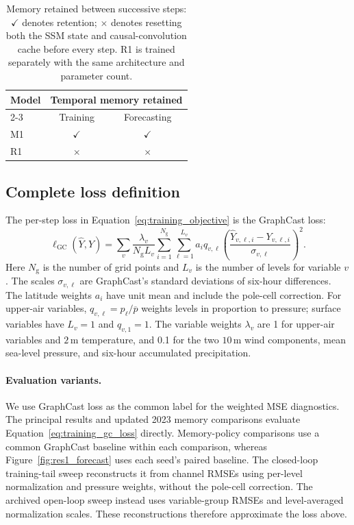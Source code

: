 \documentclass{article}
\newcommand{\vfourchange}[1]{{\color{blue}#1}}
\begin{document}
\begin{table}[!htb]
    \centering
    \small
    \begin{tabular}{lcc}
        \toprule
        \vfourchange{Model} & \multicolumn{2}{c}{Temporal memory retained} \\
        \cmidrule(lr){2-3}
        & Training & Forecasting \\
        \midrule
        \vfourchange{M1} & $\checkmark$ & $\checkmark$ \\
        \vfourchange{R1} & $\times$ & $\times$ \\
        \bottomrule
    \end{tabular}
    \caption{Memory retained between successive steps: $\checkmark$ denotes retention; $\times$ denotes resetting both the SSM state and causal-convolution cache before every step. \vfourchange{R1} is trained separately with the same architecture and parameter count.}
    \label{tab:memory_controls}
\end{table}

\subsection{Complete loss definition}
\label{app:training_loss}
The per-step loss in Equation~\ref{eq:training_objective} is the {GraphCast loss}:
\begin{equation}
    \ell_{\mathrm{GC}}(\hat{Y},Y)
    =\sum_v\frac{\lambda_v}{N_{\mathrm{g}}L_v}
      \sum_{i=1}^{N_{\mathrm{g}}}\sum_{\ell=1}^{L_v}
      a_i q_{v,\ell}
      \left(\frac{\hat{Y}_{v,\ell,i}-Y_{v,\ell,i}}
      {\sigma_{v,\ell}}\right)^2.
    \label{eq:training_gc_loss}
\end{equation}
Here $N_{\mathrm{g}}$ is the number of grid points and $L_v$ is the number of levels for variable $v$. The scales $\sigma_{v,\ell}$ are GraphCast's standard deviations of six-hour differences. The latitude weights $a_i$ have unit mean and include the pole-cell correction. For upper-air variables, $q_{v,\ell}=p_\ell/\overline{p}$ weights levels in proportion to pressure; surface variables have $L_v=1$ and $q_{v,1}=1$. The variable weights $\lambda_v$ are 1 for upper-air variables and $2$\,m temperature, and 0.1 for the two $10$\,m wind components, mean sea-level pressure, and six-hour accumulated precipitation.

\paragraph{{Evaluation variants.}}
We use GraphCast loss as the common label for the weighted MSE diagnostics. The principal results \vfourchange{and updated 2023 memory comparisons} evaluate Equation~\ref{eq:training_gc_loss} directly. \vfourchange{Memory-policy comparisons use a common GraphCast baseline within each comparison, whereas Figure~\ref{fig:res1_forecast} uses each seed's paired baseline.} The closed-loop training-tail sweep \vfourchange{reconstructs} it from channel RMSEs using per-level normalization and pressure weights, without the pole-cell correction. The archived open-loop sweep instead uses variable-group RMSEs and level-averaged normalization scales. These reconstructions therefore approximate the loss above.
\end{document}
